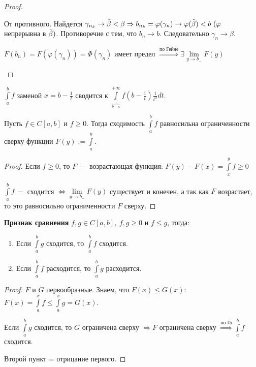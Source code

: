 \begin{statement}
\begin{enumerate}
\begin{proof}
\begin{enumerate}
                От противного. Найдется $\gamma_{n_k}\rightarrow \Tilde{\beta}<\beta\Rightarrow b_{n_k}=\varphi(\gamma_n)\rightarrow \varphi(\Tilde{\beta})<b\ (\varphi$ непрерывна в $\Tilde{\beta})$. Противоречие с тем, что $b_n\rightarrow b$. Следовательно $\gamma_n\rightarrow \beta$.

                $F(b_n)=F(\varphi(\gamma_n))=\Phi(\gamma_n)$ имеет предел $\overset{\text{по Гейне}}{\Rightarrow}\exists \lim\limits_{y\rightarrow b_-}F(y)$
            \end{enumerate}
        \end{proof}
    \end{enumerate}
\end{statement}

\begin{remark}
    $\int\limits_a^b f$ заменой $x=b-\frac{1}{t}$ сводится к $\int\limits_{\frac{1}{b-a}}^{+\infty}f(b-\frac{1}{t})\frac{1}{t^2}dt$.
\end{remark}

\begin{theorem}
    Пусть $f\in C[a,b]$ и $f\geq 0$. Тогда сходимость $\int\limits_a^b f$ равносильна ограниченности сверху функции $F(y):=\int\limits_a^y$.
\end{theorem}

\begin{proof}
    Если $f\geq 0$, то $F\ -$ возрастающая функция: $F(y)-F(x)=\int\limits_x^y f\geq 0$

    $\int\limits_a^b f\ -$ сходится $\Leftrightarrow \lim\limits_{y\rightarrow b_-} F(y)$ существует и конечен, а так как $F$ возрастает, то это равносильно ограниченности $F$ сверху.
\end{proof}

\begin{corollary}
    \textbf{Признак сравнения}
    $f, g\in C[a,b],\ f,g\geq 0$ и $f\leq g$, тогда:

    \begin{enumerate}
        \item Если $\int\limits_a^b g$ сходится, то $\int\limits_a^b f$ сходится.

        \item Если $\int\limits_a^b f$ расходится, то $\int\limits_a^b g$ расходится.
    \end{enumerate}
\end{corollary}

\begin{proof}
    $F$ и $G$ первообразные. Знаем, что $F(x)\leq G(x)$: $F(x)=\int\limits_a^x f \leq \int\limits_a^x g=G(x)$.

    Если $\int\limits_a^b g$ сходится, то $G$ ограничена сверху $\Rightarrow F$ ограничена сверху $\overset{\text{по th}}{\Rightarrow}\int\limits_a^b f$ сходится.

    Второй пункт = отрицание первого.
\end{proof}

